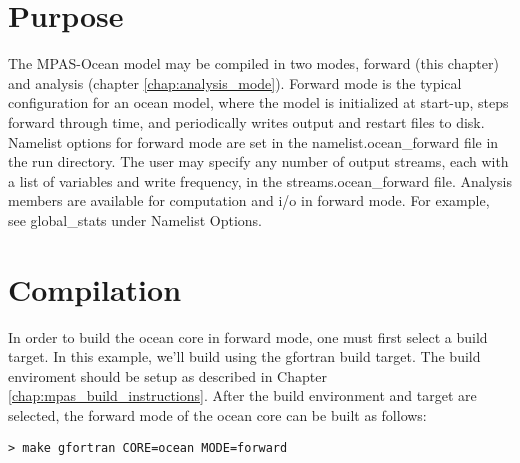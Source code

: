 \section{Purpose}
\label{sec:forward_purpose}

The MPAS-Ocean model may be compiled in two modes, forward (this chapter) and analysis (chapter \ref{chap:analysis_mode}).  Forward mode is the typical configuration for an ocean model, where the model is initialized at start-up, steps forward through time, and periodically writes output and restart files to disk.  Namelist options for forward mode are set in the namelist.ocean\_forward file in the run directory.  The user may specify any number of output streams, each with a list of variables and write frequency, in the streams.ocean\_forward file.  Analysis members are available for computation and i/o in forward mode.  For example, see global\_stats under Namelist Options.  

\section{Compilation}
\label{sec:forward_compilation}

In order to build the ocean core in forward mode, one must first select a build
target. In this example, we'll build using the gfortran build target. The build
enviroment should be setup as described in Chapter
\ref{chap:mpas_build_instructions}. After the build environment and target are
selected, the forward mode of the ocean core can be built as follows:

\vspace{12pt}
{\tt > make gfortran CORE=ocean MODE=forward}

